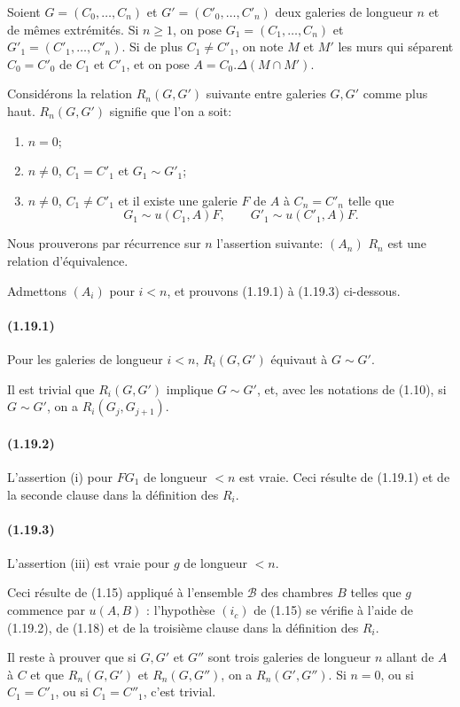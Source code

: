 \documentclass[10pt,a4paper]{article}
\newcommand{\mcB}{\mathcal B}
\begin{document}
Soient $G=(C_0,\ldots,C_n)$ et $G'=(C'_0,\ldots,C'_n)$ deux galeries de longueur $n$ et de mêmes extrémités. Si $n\ge1$, on pose $G_1=(C_1,\ldots,C_n)$ et $G'_1=(C'_1,\ldots,C'_n)$. Si de plus $C_1\ne C'_1$, on note $M$ et $M'$ les murs qui séparent $C_0=C'_0$ de $C_1$ et $C'_1$, et on pose $A=C_0.\Delta(M\cap M')$.

Considérons la relation $R_n(G,G')$ suivante entre galeries $G,G'$ comme plus haut. $R_n(G,G')$ signifie que l'on a soit:
\begin{enumerate}[label=\alph*)]
\item $n=0$;
\item $n\ne0$, $C_1=C'_1$ et $G_1\sim G'_1$;
\item $n\ne0$, $C_1\ne C'_1$ et il existe une galerie $F$ de $A$ à $C_n=C'_n$ telle que
\[
G_1\sim u(C_1,A)F,\qquad G'_1\sim u(C'_1,A)F.
\]
\end{enumerate}
Nous prouverons par récurrence sur $n$ l'assertion suivante: $(A_n)$ $R_n$ est une relation d'équivalence.

Admettons $(A_i)$ pour $i<n$, et prouvons (1.19.1) à (1.19.3) ci-dessous.

\paragraph{(1.19.1)} Pour les galeries de longueur $i<n$, $R_i(G,G')$ équivaut à $G\sim G'$.

Il est trivial que $R_i(G,G')$ implique $G\sim G'$, et, avec les notations de (1.10), si $G\sim G'$, on a $R_i(G_j,G_{j+1})$.

\paragraph{(1.19.2)} L'assertion (i) pour $FG_1$ de longueur $<n$ est vraie. Ceci résulte de (1.19.1) et de la seconde clause dans la définition des $R_i$.

\paragraph{(1.19.3)} L'assertion (iii) est vraie pour $g$ de longueur $<n$.

Ceci résulte de (1.15) appliqué à l'ensemble $\mcB$ des chambres $B$ telles que $g$ commence par $u(A,B)$ : l'hypothèse $(i_c)$ de (1.15) se vérifie à l'aide de (1.19.2), de (1.18) et de la troisième clause dans la définition des $R_i$.

Il reste à prouver que si $G,G'$ et $G''$ sont trois galeries de longueur $n$ allant de $A$ à $C$ et que $R_n(G,G')$ et $R_n(G,G'')$, on a $R_n(G',G'')$. Si $n=0$, ou si $C_1=C'_1$, ou si $C_1=C''_1$, c'est trivial.
\end{document}
